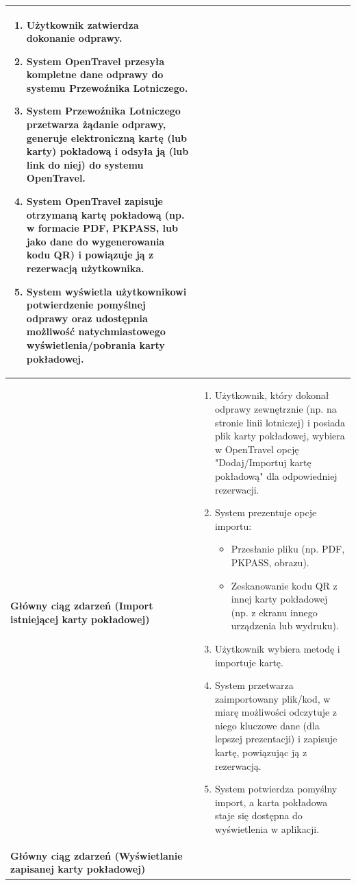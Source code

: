 \documentclass[a4paper,12pt]{article}
\begin{document}
\begin{longtable}{|p{\pierwszakolumnaszerokoscPUBLKartaPok}|p{\drugakolumnaszerokoscPUBLKartaPok}|}
\begin{enumerate}
            \item Użytkownik zatwierdza dokonanie odprawy.
            \item System OpenTravel przesyła kompletne dane odprawy do systemu Przewoźnika Lotniczego.
            \item System Przewoźnika Lotniczego przetwarza żądanie odprawy, generuje elektroniczną kartę (lub karty) pokładową i odsyła ją (lub link do niej) do systemu OpenTravel.
            \item System OpenTravel zapisuje otrzymaną kartę pokładową (np. w formacie PDF, PKPASS, lub jako dane do wygenerowania kodu QR) i powiązuje ją z rezerwacją użytkownika.
            \item System wyświetla użytkownikowi potwierdzenie pomyślnej odprawy oraz udostępnia możliwość natychmiastowego wyświetlenia/pobrania karty pokładowej.
        \end{enumerate} \\
    \hline
    \textbf{Główny ciąg zdarzeń (Import istniejącej karty pokładowej)} &
        \begin{enumerate} \itemsep0pt \parskip0pt \parsep0pt
            \item Użytkownik, który dokonał odprawy zewnętrznie (np. na stronie linii lotniczej) i posiada plik karty pokładowej, wybiera w OpenTravel opcję "Dodaj/Importuj kartę pokładową" dla odpowiedniej rezerwacji.
            \item System prezentuje opcje importu:
                \begin{itemize} \itemsep0pt \parskip0pt \parsep0pt
                    \item Przesłanie pliku (np. PDF, PKPASS, obrazu).
                    \item Zeskanowanie kodu QR z innej karty pokładowej (np. z ekranu innego urządzenia lub wydruku).
                \end{itemize}
            \item Użytkownik wybiera metodę i importuje kartę.
            \item System przetwarza zaimportowany plik/kod, w miarę możliwości odczytuje z niego kluczowe dane (dla lepszej prezentacji) i zapisuje kartę, powiązując ją z rezerwacją.
            \item System potwierdza pomyślny import, a karta pokładowa staje się dostępna do wyświetlenia w aplikacji.
        \end{enumerate} \\
    \hline
    \textbf{Główny ciąg zdarzeń (Wyświetlanie zapisanej karty pokładowej)} &

\end{longtable}
\end{document}
